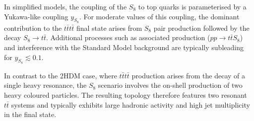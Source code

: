In simplified models, the coupling of the $S_{8}$ to top quarks is
parameterised by a Yukawa-like coupling \(y_{S_8}\).
For moderate values of this coupling, the dominant contribution to the
$t\bar{t}t\bar{t}$ final state arises from $S_{8}$ pair production followed by the
decay \(S_8\rightarrow t\bar{t}\).
Additional processes such as associated production
(\(pp \rightarrow t\bar{t}S_8\)) and interference with the Standard Model
background are typically subleading for \(y_{S_8}\lesssim 0.1\).

In contrast to the 2HDM case, where $t\bar{t}t\bar{t}$ production arises from the
decay of a single heavy resonance, the $S_{8}$ scenario involves the
on-shell production of two heavy coloured particles.
The resulting topology therefore features two resonant
\(t\bar{t}\) systems and typically exhibits large hadronic activity and
high jet multiplicity in the final state.


